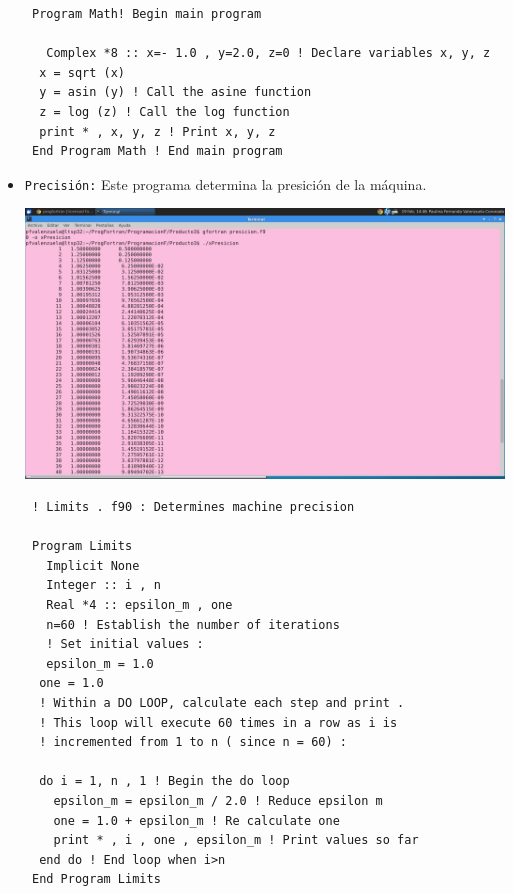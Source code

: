 \documentclass[12pt]{article}
\begin{document}
\begin{itemize}
\begin{verbatim}
 Program Math! Begin main program

   Complex *8 :: x=- 1.0 , y=2.0, z=0 ! Declare variables x, y, z
  x = sqrt (x)  
  y = asin (y) ! Call the asine function
  z = log (z) ! Call the log function
  print * , x, y, z ! Print x, y, z
 End Program Math ! End main program 
\end{verbatim}
 
 \item {\tt Precisión:}
Este programa determina la presición de la máquina.
 \begin{center}
\includegraphics[scale=0.2]{Presicion.png}
\end{center}

 \begin{verbatim}
 ! Limits . f90 : Determines machine precision
 
 Program Limits
   Implicit None
   Integer :: i , n
   Real *4 :: epsilon_m , one
   n=60 ! Establish the number of iterations
   ! Set initial values :
   epsilon_m = 1.0
  one = 1.0
  ! Within a DO LOOP, calculate each step and print .
  ! This loop will execute 60 times in a row as i is
  ! incremented from 1 to n ( since n = 60) :

  do i = 1, n , 1 ! Begin the do loop
    epsilon_m = epsilon_m / 2.0 ! Reduce epsilon m
    one = 1.0 + epsilon_m ! Re calculate one
    print * , i , one , epsilon_m ! Print values so far
  end do ! End loop when i>n
 End Program Limits
  
\end{verbatim}
 

\end{itemize}
\end{document}

